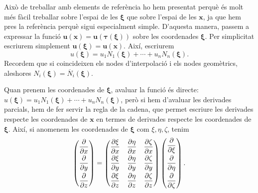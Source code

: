 \documentclass{article}
\begin{document}
Aix\`{o} de treballar amb elements de refer\`{e}ncia ho hem presentat perqu\`{e} \'{e}s molt m\'{e}s f\`{a}cil treballar sobre l'espai de les $\boldsymbol{\xi}$ que sobre l'espai de les $\boldsymbol{x}$, ja que hem pres la refer\`{e}ncia perqu\`{e} sigui especialment simple. D'aquesta manera, passem a expressar la funci\'{o} $\boldsymbol{u}(\boldsymbol{x})=\boldsymbol{u}(\boldsymbol{\tau}(\boldsymbol{\xi}))$ sobre les coordenades $\boldsymbol{\xi}$. Per simplicitat escriurem simplement $\boldsymbol{u}(\boldsymbol{\xi})=\boldsymbol{u}(\boldsymbol{x})$. Aix\'{i}, escriurem
\[u(\boldsymbol{\xi})=u_1N_1(\boldsymbol{\xi})+\cdots+u_nN_n(\boldsymbol{\xi}).\]
Recordem que si coincideixen els nodes d'interpolaci\'{o} i els nodes geom\`{e}trics, aleshores $N_i(\boldsymbol{\xi})=\overline{N}_i(\boldsymbol{\xi})$.

Quan prenem les coordenades de $\boldsymbol{\xi}$, avaluar la funci\'{o} \'{e}s directe: $u(\boldsymbol{\xi})=u_1N_1(\boldsymbol{\xi})+\cdots+u_nN_n(\boldsymbol{\xi})$, per\`{o} si hem d'avaluar les derivades parcials, hem de fer servir la regla de la cadena, que permet escriure les derivades respecte les coordenades de $\boldsymbol{x}$ en termes de derivades respecte les coordenades de $\boldsymbol{\xi}$. Aix\'{i}, si anomenem les coordenades de $\boldsymbol{\xi}$ com $\xi,\eta,\zeta$, tenim
\[\left(\begin{matrix}\displaystyle{\frac\partial{\partial x}}\vspace{1mm}\\\displaystyle{\frac\partial{\partial y}}\vspace{1mm}\\\displaystyle{\frac\partial{\partial z}}\end{matrix}\right)=\left(\begin{matrix}\displaystyle{\frac{\partial\xi}{\partial x}}&\displaystyle{\frac{\partial\eta}{\partial x}}&\displaystyle{\frac{\partial\zeta}{\partial x}}\vspace{1mm}\\\displaystyle{\frac{\partial\xi}{\partial y}}&\displaystyle{\frac{\partial\eta}{\partial y}}&\displaystyle{\frac{\partial\zeta}{\partial y}}\vspace{1mm}\\\displaystyle{\frac{\partial\xi}{\partial z}}&\displaystyle{\frac{\partial\eta}{\partial z}}&\displaystyle{\frac{\partial\zeta}{\partial z}}\end{matrix}\right)\left(\begin{matrix}\displaystyle{\frac\partial{\partial\xi}}\vspace{1mm}\\\displaystyle{\frac\partial{\partial\eta}}\vspace{1mm}\\\displaystyle{\frac\partial{\partial\zeta}}\end{matrix}\right).\]
\end{document}
